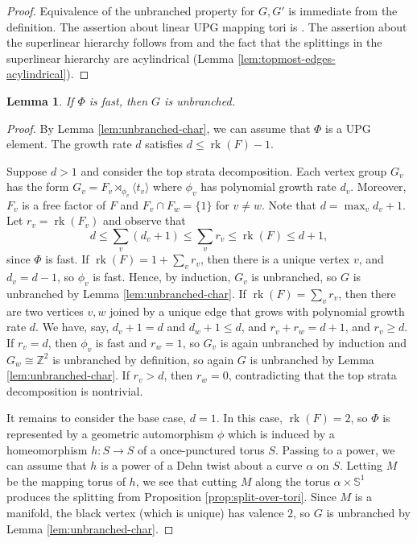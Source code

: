 \documentclass[11pt,oneside]{amsart}
\newcounter{ax}
\newtheorem{lem}[thm]{Lemma}
\theoremstyle{definition}
\DeclareMathOperator{\rank}{rk}
\newcommand{\field}[1]{\mathbb{#1}}
\newcommand{\integers}{\ensuremath{\field{Z}}}
\begin{document}
\begin{proof}
Equivalence of the unbranched property for $G,G'$ is immediate from the definition.  The assertion about linear UPG mapping tori is \cite[Lem. 4.8]{BGGH}.  The assertion about the superlinear hierarchy follows from \cite[Prop. 3.3]{BGGH} and the fact that the splittings in the superlinear hierarchy are acylindrical (Lemma \ref{lem:topmost-edges-acylindrical}).
\end{proof}

\begin{lem}\label{lem:fast-implies-unbranched}
If $\Phi$ is fast, then $G$ is unbranched.
\end{lem}

\begin{proof}
By Lemma \ref{lem:unbranched-char}, we can assume that $\Phi$ is a UPG element.  The growth rate $d$ satisfies $d\leq \rank(F)-1$.  

Suppose $d>1$ and consider the top strata decomposition.  Each vertex group $G_v$ has the form $G_v=F_v\rtimes_{\phi_v}\langle t_v\rangle$ where $\phi_v$ has polynomial growth rate $d_v$.  Moreover, $F_v$ is a free factor of $F$ and $F_v\cap F_w=\{1\}$ for $v\neq w$.   Note that $d=\max_v d_v+1.$ Let $r_v=\rank(F_v)$ and observe that
$$d\leq \sum_v(d_v+1)\leq \sum_vr_v\leq \rank(F)\leq d+1,$$
since $\Phi$ is fast.  If $\rank(F)=1+\sum_v r_v$, then there is a unique vertex $v$, and $d_v=d-1$, so $\phi_v$ is fast.  Hence, by induction, $G_v$ is unbranched, so $G$ is unbranched by Lemma \ref{lem:unbranched-char}.  If $\rank(F)=\sum_v r_v$, then there are two vertices $v,w$ joined by a unique edge that grows with polynomial growth rate $d$.  We have, say, $d_v+1=d$ and $d_w+1\leq d$, and $r_v+r_w=d+1$, and $r_v\geq d$.  If $r_v=d$, then $\phi_v$ is fast and $r_w=1$, so $G_v$ is again unbranched by induction and $G_w\cong\integers^2$ is unbranched by definition, so again $G$ is unbranched by Lemma \ref{lem:unbranched-char}.  If $r_v>d$, then $r_w=0$, contradicting that the top strata decomposition is nontrivial.  

It remains to consider the base case, $d=1$.  In this case, $\rank(F)=2$, so $\Phi$ is represented by a geometric automorphism $\phi$ which is induced by a homeomorphism $h:S\to S$ of a once-punctured torus $S$.  Passing to a power, we can assume that $h$ is a power of a Dehn twist about a curve $\alpha$ on $S$.  Letting $M$ be the mapping torus of $h$, we see that cutting $M$ along the torus $\alpha\times \mathbb S^1$ produces the splitting from Proposition \ref{prop:split-over-tori}.  Since $M$ is a manifold, the black vertex (which is unique) has valence $2$, so $G$ is unbranched by Lemma \ref{lem:unbranched-char}.
\end{proof}
\end{document}
